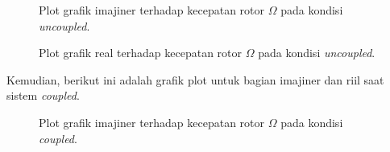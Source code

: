 \begin{figure}[H]
	\centering
	\caption{Plot grafik imajiner terhadap kecepatan rotor $\Omega$ pada kondisi \textit{uncoupled}.}
	\label{fig:imag(uncoupled)}
\end{figure}

\begin{figure}[H]
	\centering
	\caption{Plot grafik real terhadap kecepatan rotor $\Omega$ pada kondisi \textit{uncoupled}.}
	\label{fig:real(uncoupled)}
\end{figure}

Kemudian, berikut ini adalah grafik plot untuk bagian imajiner dan riil saat sistem \textit{coupled}.

\begin{figure}[H]
	\centering
	\caption{Plot grafik imajiner terhadap kecepatan rotor $\Omega$ pada kondisi \textit{coupled}.}
	\label{fig:imag(coupled)}
\end{figure}


